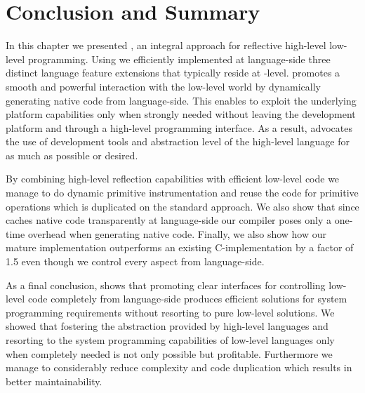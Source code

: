 \section{Conclusion and Summary}
In this chapter we presented \B, an integral approach for reflective high-level low-level programming.
Using \B we efficiently implemented at language-side three distinct language feature extensions that typically reside at \VM-level.
\B promotes a smooth and powerful interaction with the low-level world by dynamically generating native code from language-side.
This enables to exploit the underlying platform capabilities only when strongly needed without leaving the development platform and through a high-level programming interface. 
As a result, \B advocates the use of development tools and abstraction level of the high-level language for as much as possible or desired.

By combining high-level reflection capabilities with efficient low-level code we manage to do dynamic primitive instrumentation and reuse the code for primitive operations which is duplicated on the standard \JIT approach.
We also show that since \B caches native code transparently at language-side our \JIT compiler poses only a one-time overhead when generating native code. 
Finally, we also show how our mature \FFI implementation outperforms an existing C-\FFI implementation by a factor of 1.5 even though we control every aspect from language-side.

As a final conclusion, \B shows that promoting clear interfaces for controlling low-level code completely from language-side produces efficient solutions for system programming requirements without resorting to pure low-level solutions.
We showed that fostering the abstraction provided by high-level languages and resorting to the system programming capabilities of low-level languages only when completely needed is not only possible but profitable.
Furthermore we manage to considerably reduce complexity and code duplication which results in better maintainability.



